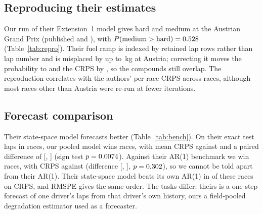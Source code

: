 \subsection{Reproducing their estimates}

Our run of their Extension~1 model gives hard \TableThreeHard\spl{} and medium \TableThreeMedium\spl{} at the Austrian Grand Prix (published \TableThreeHardPub{} and \TableThreeMediumPub), with $P(\text{medium}>\text{hard})=0.528$ (Table~\ref{tab:repro}).
Their fuel ramp is indexed by retained lap rows rather than lap number and is misplaced by up to \FuelDefectKg\,kg at Austria; correcting it moves the probability to \PMediumGtHardCorrected{} and the CRPS by \FuelDefectDeltaCRPS, so the compounds still overlap.
The reproduction correlates \ReproCorr{} with the authors' per-race CRPS across \ReproRaces{} races, although most races other than Austria were re-run at fewer iterations.

\begin{table}[t]
\centering\small

\caption{Degradation rates $v$ (s/lap, mean with 95\% interval) of the hard and medium compounds in the Extension~1 state-space model at the Austrian Grand Prix 2025: as published in the first version of \citet{cappello2025state} (the journal version prints 0.132 for the hard upper bound), as reproduced with their code, and with the fuel ramp indexed by lap number. $P(\mathrm{medium}>\mathrm{hard})$ is the posterior probability that the medium rate is higher.}
\label{tab:repro}
\end{table}

\subsection{Forecast comparison}

Their state-space model forecasts better (Table~\ref{tab:bench}).
On their exact test laps in \BenchNRaces{} races, our pooled model wins \BenchWinsVsRepoSSM{} races, with mean CRPS \BenchCRPSOurs{} against \BenchCRPSSSM{} and a paired difference of \BenchDiffSSM{} [\BenchDiffSSMLo, \BenchDiffSSMHi] (sign test $p=0.0074$).
Against their AR(1) benchmark we win \JournalWinsAR{} races, with CRPS \BenchCRPSOurs{} against \JournalCRPSAR{} (difference \JournalDiffAR{} [\JournalDiffARLo, \JournalDiffARHi], $p=0.302$), so we cannot be told apart from their AR(1).
Their state-space model beats its own AR(1) in \JournalSSMBeatsARCommon{} of these races on CRPS, and RMSPE gives the same order.
The tasks differ: theirs is a one-step forecast of one driver's laps from that driver's own history, ours a field-pooled degradation estimator used as a forecaster.

